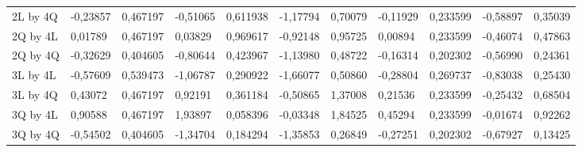 \begin{table}[H]
{\begin{tabular}{lllllllllll}
\rowcolor[HTML]{FFFFFF} 
2L by 4Q       & {\color[HTML]{181A1B} -0,23857} & {\color[HTML]{181A1B} 0,467197} & {\color[HTML]{181A1B} -0,51065} & {\color[HTML]{181A1B} 0,611938} & {\color[HTML]{181A1B} -1,17794} & {\color[HTML]{181A1B} 0,70079}  & {\color[HTML]{181A1B} -0,11929} & {\color[HTML]{181A1B} 0,233599} & {\color[HTML]{181A1B} -0,58897} & {\color[HTML]{181A1B} 0,35039}  \\
\rowcolor[HTML]{FFFFFF} 
2Q by 4L       & {\color[HTML]{181A1B} 0,01789}  & {\color[HTML]{181A1B} 0,467197} & {\color[HTML]{181A1B} 0,03829}  & {\color[HTML]{181A1B} 0,969617} & {\color[HTML]{181A1B} -0,92148} & {\color[HTML]{181A1B} 0,95725}  & {\color[HTML]{181A1B} 0,00894}  & {\color[HTML]{181A1B} 0,233599} & {\color[HTML]{181A1B} -0,46074} & {\color[HTML]{181A1B} 0,47863}  \\
\rowcolor[HTML]{FFFFFF} 
2Q by 4Q       & {\color[HTML]{181A1B} -0,32629} & {\color[HTML]{181A1B} 0,404605} & {\color[HTML]{181A1B} -0,80644} & {\color[HTML]{181A1B} 0,423967} & {\color[HTML]{181A1B} -1,13980} & {\color[HTML]{181A1B} 0,48722}  & {\color[HTML]{181A1B} -0,16314} & {\color[HTML]{181A1B} 0,202302} & {\color[HTML]{181A1B} -0,56990} & {\color[HTML]{181A1B} 0,24361}  \\
\rowcolor[HTML]{FFFFFF} 
3L by 4L       & {\color[HTML]{181A1B} -0,57609} & {\color[HTML]{181A1B} 0,539473} & {\color[HTML]{181A1B} -1,06787} & {\color[HTML]{181A1B} 0,290922} & {\color[HTML]{181A1B} -1,66077} & {\color[HTML]{181A1B} 0,50860}  & {\color[HTML]{181A1B} -0,28804} & {\color[HTML]{181A1B} 0,269737} & {\color[HTML]{181A1B} -0,83038} & {\color[HTML]{181A1B} 0,25430}  \\
\rowcolor[HTML]{FFFFFF} 
3L by 4Q       & {\color[HTML]{181A1B} 0,43072}  & {\color[HTML]{181A1B} 0,467197} & {\color[HTML]{181A1B} 0,92191}  & {\color[HTML]{181A1B} 0,361184} & {\color[HTML]{181A1B} -0,50865} & {\color[HTML]{181A1B} 1,37008}  & {\color[HTML]{181A1B} 0,21536}  & {\color[HTML]{181A1B} 0,233599} & {\color[HTML]{181A1B} -0,25432} & {\color[HTML]{181A1B} 0,68504}  \\
\rowcolor[HTML]{FFFFFF} 
3Q by 4L       & {\color[HTML]{181A1B} 0,90588}  & {\color[HTML]{181A1B} 0,467197} & {\color[HTML]{181A1B} 1,93897}  & {\color[HTML]{181A1B} 0,058396} & {\color[HTML]{181A1B} -0,03348} & {\color[HTML]{181A1B} 1,84525}  & {\color[HTML]{181A1B} 0,45294}  & {\color[HTML]{181A1B} 0,233599} & {\color[HTML]{181A1B} -0,01674} & {\color[HTML]{181A1B} 0,92262}  \\
\rowcolor[HTML]{FFFFFF} 
3Q by 4Q       & {\color[HTML]{181A1B} -0,54502} & {\color[HTML]{181A1B} 0,404605} & {\color[HTML]{181A1B} -1,34704} & {\color[HTML]{181A1B} 0,184294} & {\color[HTML]{181A1B} -1,35853} & {\color[HTML]{181A1B} 0,26849}  & {\color[HTML]{181A1B} -0,27251} & {\color[HTML]{181A1B} 0,202302} & {\color[HTML]{181A1B} -0,67927} & {\color[HTML]{181A1B} 0,13425} 
\end{tabular}
}
\end{table}

